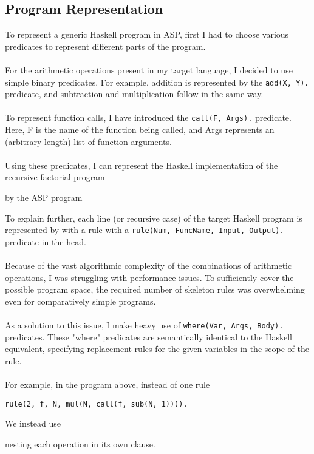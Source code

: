 \subsection{Program Representation}
To represent a generic Haskell program in ASP, first I had to choose various predicates to represent different parts of the program.\\ \\
For the arithmetic operations present in my target language, I decided to use simple binary predicates. For example, addition is represented by the \lstinline{add(X, Y).} predicate, and subtraction and multiplication follow in the same way. \\ \\%
To represent function calls, I have introduced the \lstinline{call(F, Args).} predicate. Here, F is the name of the function being called, and Args represents an (arbitrary length) list of function arguments. \\ \\ %
Using these predicates, I can represent the Haskell implementation of the recursive factorial program

by the ASP program

To explain further, each line (or recursive case) of the target Haskell program is represented by with a rule with a \lstinline{rule(Num, FuncName, Input, Output).} predicate in the head. \\ \\%
Because of the vast algorithmic complexity of the combinations of arithmetic operations, I was struggling with performance issues. To sufficiently cover the possible program space, the required number of skeleton rules was overwhelming even for comparatively simple programs. \\ \\
As a solution to this issue, I make heavy use of \lstinline{where(Var, Args, Body).} predicates. These "where" predicates are semantically identical to the Haskell equivalent, specifying replacement rules for the given variables in the scope of the rule. \\ \\%
For example, in the program above, instead of one rule
\begin{lstlisting}
rule(2, f, N, mul(N, call(f, sub(N, 1)))).
\end{lstlisting}
We instead use

nesting each operation in its own clause.

